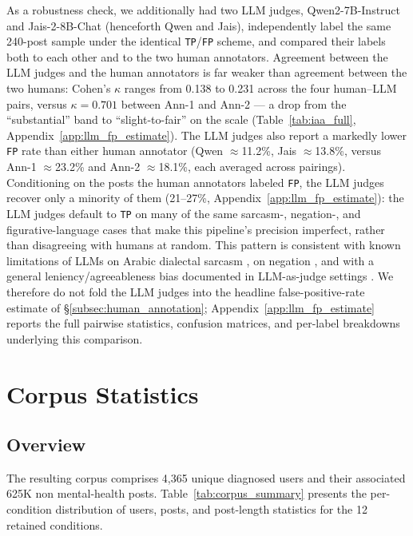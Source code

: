 \documentclass[11pt]{article}
\begin{document}
As a robustness check, we additionally had two LLM judges, Qwen2-7B-Instruct \citep{yang-etal-2024-qwen2} and Jais-2-8B-Chat \citep{anwar-etal-2025-jais2} (henceforth Qwen and Jais), independently label the same 240-post sample under the identical
\texttt{TP}/\texttt{FP} scheme, and compared their labels both to each
other and to the two human annotators. Agreement between the LLM
judges and the human annotators is far weaker than agreement between
the two humans: Cohen's $\kappa$ ranges from 0.138 to 0.231 across the
four human--LLM pairs, versus $\kappa = 0.701$ between Ann-1 and Ann-2
--- a drop from the ``substantial'' band to ``slight-to-fair'' on the
\citet{landis1977measurement} scale (Table~\ref{tab:iaa_full},
Appendix~\ref{app:llm_fp_estimate}). The LLM judges also report a
markedly lower \texttt{FP} rate than either human annotator (Qwen
$\approx$11.2\%, Jais $\approx$13.8\%, versus Ann-1 $\approx$23.2\% and
Ann-2 $\approx$18.1\%, each averaged across pairings). Conditioning on
the posts the human annotators labeled \texttt{FP}, the LLM judges
recover only a minority of them (21--27\%, Appendix~\ref{app:llm_fp_estimate}):
the LLM judges default to \texttt{TP} on many of the same sarcasm-,
negation-, and figurative-language cases that make this pipeline's
precision imperfect, rather than disagreeing with humans at random.
This pattern is consistent with known limitations of LLMs on Arabic
dialectal sarcasm \citep{abu-farha-magdy-2020-arabic}, on negation
\citep{garcia-ferrero-etal-2023-not}, and with a general
leniency/agreeableness bias documented in LLM-as-judge settings
\citep{jain2025beyond}. We therefore do not fold the LLM judges
into the headline false-positive-rate estimate of
\S\ref{subsec:human_annotation}; Appendix~\ref{app:llm_fp_estimate}
reports the full pairwise statistics, confusion matrices, and per-label
breakdowns underlying this comparison.

\section{Corpus Statistics}
\label{sec:corpus}

\subsection{Overview}
\label{subsec:corpus_overview}
The resulting corpus comprises 4,365 unique diagnosed users and their associated 625K non mental-health posts. Table~\ref{tab:corpus_summary} presents the per-condition distribution of users, posts, and post-length statistics for the 12 retained conditions.
\end{document}
